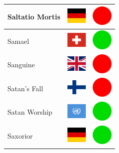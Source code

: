\documentclass[12pt, a4paper, twoside]{report}
\begin{document}
\begin{center}
\begin{longtable}{|p{5cm}|p{2cm}|p{2cm}|}
Saltatio Mortis & \includegraphics[width=1cm]{4x3/de} & \includegraphics[width=1cm]{likes/n} \\ \hline
Samael & \includegraphics[width=1cm]{4x3/ch} & \includegraphics[width=1cm]{likes/y} \\ \hline
Sanguine & \includegraphics[width=1cm]{4x3/gb} & \includegraphics[width=1cm]{likes/n} \\ \hline
Satan's Fall & \includegraphics[width=1cm]{4x3/fi} & \includegraphics[width=1cm]{likes/n} \\ \hline
Satan Worship & \includegraphics[width=1cm]{4x3/un} & \includegraphics[width=1cm]{likes/y} \\ \hline
Saxorior & \includegraphics[width=1cm]{4x3/de} & \includegraphics[width=1cm]{likes/y} \\ \hline

\end{longtable}
\end{center}
\end{document}

